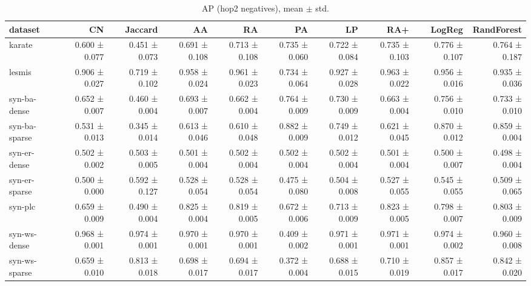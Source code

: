 \begin{table}[t]
\centering
\caption{AP (hop2 negatives), mean $\pm$ std.}
\label{tab:main_ap_hop2}
\begin{tabular}{lrrrrrrrrr}
\hline
dataset & CN & Jaccard & AA & RA & PA & LP & RA+ & LogReg & RandForest \\
\hline
karate & 0.600 ± 0.077 & 0.451 ± 0.073 & 0.691 ± 0.108 & 0.713 ± 0.108 & 0.735 ± 0.060 & 0.722 ± 0.084 & 0.735 ± 0.103 & 0.776 ± 0.107 & 0.764 ± 0.187 \\
lesmis & 0.906 ± 0.027 & 0.719 ± 0.102 & 0.958 ± 0.024 & 0.961 ± 0.023 & 0.734 ± 0.064 & 0.927 ± 0.028 & 0.963 ± 0.022 & 0.956 ± 0.016 & 0.935 ± 0.036 \\
syn-ba-dense & 0.652 ± 0.007 & 0.460 ± 0.004 & 0.693 ± 0.007 & 0.662 ± 0.004 & 0.764 ± 0.009 & 0.730 ± 0.009 & 0.663 ± 0.004 & 0.756 ± 0.010 & 0.733 ± 0.010 \\
syn-ba-sparse & 0.531 ± 0.013 & 0.345 ± 0.014 & 0.613 ± 0.046 & 0.610 ± 0.048 & 0.882 ± 0.009 & 0.749 ± 0.012 & 0.621 ± 0.045 & 0.870 ± 0.012 & 0.859 ± 0.004 \\
syn-er-dense & 0.502 ± 0.002 & 0.503 ± 0.005 & 0.501 ± 0.004 & 0.502 ± 0.004 & 0.502 ± 0.004 & 0.502 ± 0.004 & 0.501 ± 0.004 & 0.500 ± 0.007 & 0.498 ± 0.004 \\
syn-er-sparse & 0.500 ± 0.000 & 0.592 ± 0.127 & 0.528 ± 0.054 & 0.528 ± 0.054 & 0.475 ± 0.080 & 0.504 ± 0.008 & 0.527 ± 0.055 & 0.545 ± 0.055 & 0.509 ± 0.065 \\
syn-plc & 0.659 ± 0.009 & 0.490 ± 0.004 & 0.825 ± 0.004 & 0.819 ± 0.005 & 0.672 ± 0.006 & 0.713 ± 0.009 & 0.823 ± 0.005 & 0.798 ± 0.007 & 0.803 ± 0.009 \\
syn-ws-dense & 0.968 ± 0.001 & 0.974 ± 0.001 & 0.970 ± 0.001 & 0.970 ± 0.001 & 0.409 ± 0.002 & 0.971 ± 0.001 & 0.971 ± 0.001 & 0.974 ± 0.002 & 0.960 ± 0.008 \\
syn-ws-sparse & 0.659 ± 0.010 & 0.813 ± 0.018 & 0.698 ± 0.017 & 0.694 ± 0.017 & 0.372 ± 0.004 & 0.688 ± 0.015 & 0.710 ± 0.019 & 0.857 ± 0.017 & 0.842 ± 0.020 \\
\hline
\end{tabular}
\end{table}